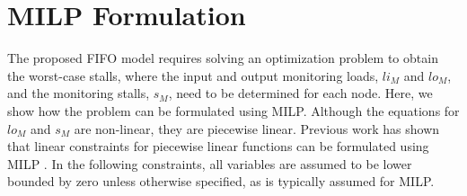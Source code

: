 \section{MILP Formulation}
\label{sec:formulation:milp}


The proposed FIFO model requires solving an optimization problem to obtain the
worst-case stalls, where the input and output monitoring loads, $li_{M}$ and $lo_{M}$, 
and the monitoring stalls, $s_{M}$, need to be determined for each node. Here, we show how
the problem can be formulated using MILP. Although the equations 
for $lo_{M}$ and $s_{M}$ are non-linear, they are piecewise linear. Previous work has
shown that linear constraints for piecewise linear functions can be
formulated using MILP \cite{sierksma-lp}. In the
following constraints, all variables are assumed to be lower bounded by zero
unless otherwise specified, as is typically assumed for MILP.

